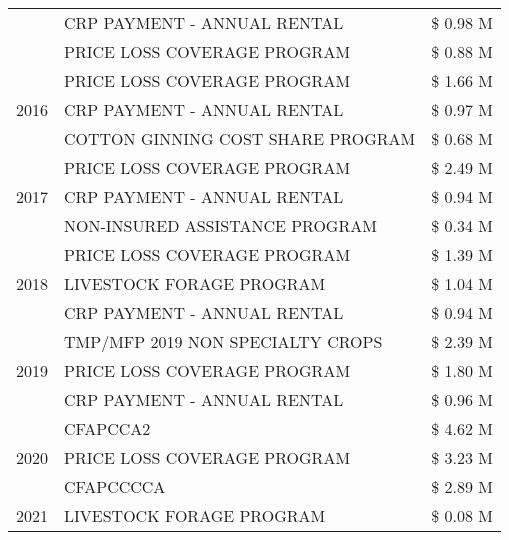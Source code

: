 \begin{tabular}{llr}
 & CRP PAYMENT - ANNUAL RENTAL & \$ 0.98 M \\
 & PRICE LOSS COVERAGE PROGRAM & \$ 0.88 M \\
\cline{1-3}
\multirow[t]{3}{*}{2016} & PRICE LOSS COVERAGE PROGRAM & \$ 1.66 M \\
 & CRP PAYMENT - ANNUAL RENTAL & \$ 0.97 M \\
 & COTTON GINNING COST SHARE PROGRAM & \$ 0.68 M \\
\cline{1-3}
\multirow[t]{3}{*}{2017} & PRICE LOSS COVERAGE PROGRAM & \$ 2.49 M \\
 & CRP PAYMENT - ANNUAL RENTAL & \$ 0.94 M \\
 & NON-INSURED ASSISTANCE PROGRAM & \$ 0.34 M \\
\cline{1-3}
\multirow[t]{3}{*}{2018} & PRICE LOSS COVERAGE PROGRAM & \$ 1.39 M \\
 & LIVESTOCK FORAGE PROGRAM & \$ 1.04 M \\
 & CRP PAYMENT - ANNUAL RENTAL & \$ 0.94 M \\
\cline{1-3}
\multirow[t]{3}{*}{2019} & TMP/MFP 2019 NON SPECIALTY CROPS & \$ 2.39 M \\
 & PRICE LOSS COVERAGE PROGRAM & \$ 1.80 M \\
 & CRP PAYMENT - ANNUAL RENTAL & \$ 0.96 M \\
\cline{1-3}
\multirow[t]{3}{*}{2020} & CFAPCCA2 & \$ 4.62 M \\
 & PRICE LOSS COVERAGE PROGRAM & \$ 3.23 M \\
 & CFAPCCCCA & \$ 2.89 M \\
\cline{1-3}
2021 & LIVESTOCK FORAGE PROGRAM & \$ 0.08 M \\
\cline{1-3}
\bottomrule
\end{tabular}
